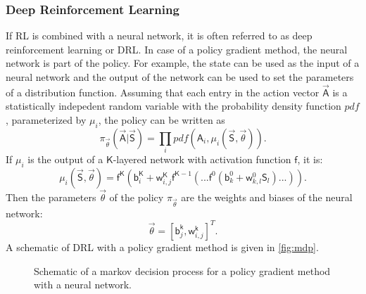 \subsubsection{Deep Reinforcement Learning}
If RL is combined with a neural network, it is often referred to as deep reinforcement learning or DRL. In case of a policy gradient method, the neural network is part of the policy. For example, the state can be used as the input of a neural network and the output of the network can be used to set the parameters of a distribution function. Assuming that each entry in the action vector $\vec{\mathsf{A}}$ is a statistically indepedent random variable with the probability density function $pdf$, parameterized by $\mu_i$, the policy can be written as
\begin{equation}
	\pi_{\vec{\theta}}(\vec{\mathsf{A}}|\vec{\mathsf{S}}) = \prod_i pdf(\mathsf{A}_i, \mu_i(\vec{\mathsf{S}},\vec{\theta})). \label{eq:policy}
\end{equation}
If $\mu_i$ is the output of a $\mathsf{K}$-layered network with activation function $\mathsf{f}$, it is:
\begin{equation}
\mu_i(\vec{\mathsf{S}}, \vec{\theta}) = \mathsf{f}^\mathsf{\mathsf{K}} ( \mathsf{b}^\mathsf{K}_i+\mathsf{w}^\mathsf{K}_{i,j} \mathsf{f}^{\mathsf{K}-1} (...\mathsf{f}^{0}(\mathsf{b}^0_k + \mathsf{w}^0_{k,l}\mathsf{S}_l)...)). \label{eq:backprop1}
\end{equation}
Then the parameters $\vec{\theta}$ of the policy $\pi_{\vec{\theta}}$ are the weights and biases of the neural network:
\begin{equation}
	\vec{\theta} = \left[\mathsf{b}_j^\mathsf{k}, \mathsf{w}_{i,j}^\mathsf{k}\right]^T.
\end{equation}
A schematic of DRL with a policy gradient method is given in \autoref{fig:mdp}.
\begin{figure}[h]
	\centering
	\def\svgwidth{0.7 \textwidth}
	
	\caption{Schematic of a markov decision process for a policy gradient method with a neural network.}
	\label{fig:mdp}
\end{figure}
